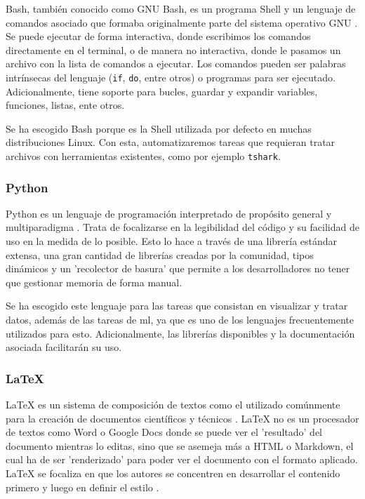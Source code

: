 \color{blue} %

Bash, también conocido como GNU Bash, es un programa Shell y un lenguaje de comandos asociado que formaba originalmente parte del sistema operativo GNU \cite{gnubashweb} \cite{gnubashmanual}. Se puede ejecutar de forma interactiva, donde escribimos los comandos directamente en el terminal, o de manera no interactiva, donde le pasamos un archivo con la lista de comandos a ejecutar. Los comandos pueden ser palabras intrínsecas del lenguaje (\texttt{if}, \texttt{do}, entre otros) o programas para ser ejecutado. Adicionalmente, tiene soporte para bucles, guardar y expandir variables, funciones, listas, ente otros.

Se ha escogido Bash porque es la Shell utilizada por defecto en muchas distribuciones Linux. Con esta, automatizaremos tareas que requieran tratar archivos con herramientas existentes, como por ejemplo \texttt{tshark}.

\subsubsection{Python}

Python es un lenguaje de programación interpretado de propósito general y multiparadigma \cite{aboutpython} \cite{davepython}. Trata de focalizarse en la legibilidad del código y su facilidad de uso en la medida de lo posible. Esto lo hace a través de una librería estándar extensa, una gran cantidad de librerías creadas por la comunidad, tipos dinámicos y un 'recolector de basura' que permite a los desarrolladores no tener que gestionar memoria de forma manual.

Se ha escogido este lenguaje para las tareas que consistan en visualizar y tratar datos, además de las tareas de \gls{ml}, ya que es uno de los lenguajes frecuentemente utilizados para esto. Adicionalmente, las librerías disponibles y la documentación asociada facilitarán su uso.

\subsubsection{LaTeX}

LaTeX es un sistema de composición de textos como el utilizado comúnmente para la creación de documentos científicos y técnicos \cite{latexweb}. LaTeX no es un procesador de textos como Word o Google Docs donde se puede ver el 'resultado' del documento mientras lo editas, sino que se asemeja más a HTML o Markdown, el cual ha de ser 'renderizado' para poder ver el documento con el formato aplicado. LaTeX se focaliza en que los autores se concentren en desarrollar el contenido primero y luego en definir el estilo \cite{latexabout}.

